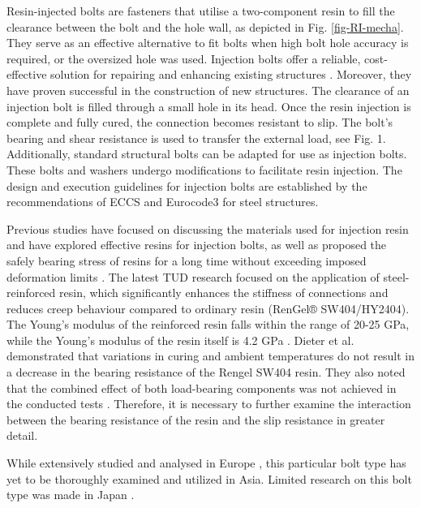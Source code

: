  Resin-injected bolts are fasteners that utilise a two-component resin to fill the clearance between the bolt and the hole wall, as depicted in Fig. \ref{fig-RI-mecha}. They serve as an effective alternative to fit bolts when high bolt hole accuracy is required, or the oversized hole was used. Injection bolts offer a reliable, cost-effective solution for repairing and enhancing existing structures \cite{gresnigt1996injbolt}. Moreover, they have proven successful in the construction of new structures. The clearance of an injection bolt is filled through a small hole in its head. Once the resin injection is complete and fully cured, the connection becomes resistant to slip. The bolt's bearing and shear resistance is used to transfer the external load, see  Fig. 1. Additionally, standard structural bolts can be adapted for use as injection bolts. These bolts and washers undergo modifications to facilitate resin injection. The design and execution guidelines for injection bolts are established by the recommendations of ECCS \cite{eccs1985} and Eurocode3 \cite{eurocode3-21,en1090-2-2018} for steel structures.
 
Previous studies have focused on discussing the materials used for injection resin and have explored effective resins for injection bolts, as well as proposed the safely bearing stress of resins for a long time without exceeding imposed deformation limits \cite{kolstein2017injbolt-mec}. The latest TUD research focused on the application of steel-reinforced resin, which significantly enhances the stiffness of connections and reduces creep behaviour compared to ordinary resin (RenGel® SW404/HY2404). The Young's modulus of the reinforced resin falls within the range of 20-25 GPa, while the Young's modulus of the resin itself is 4.2 GPa \cite{nijgh_new_2017}. Dieter et al. demonstrated that variations in curing and ambient temperatures do not result in a decrease in the bearing resistance of the Rengel SW404 resin. They also noted that the combined effect of both load-bearing components was not achieved in the conducted tests \cite{ungermann2023injbolt-mec}. Therefore, it is necessary to further examine the interaction between the bearing resistance of the resin and the slip resistance in greater detail.

While extensively studied and analysed in Europe \cite{gresnigt1996injbolt, kolstein2017injbolt-mec, ungermann2023injbolt-mec, pedrosa2020injbolt-fati, pedrosa2022injbolt-mec,pedrosa2021injbolt-fati,gresnigt2000injtbolt-use}, this particular bolt type has yet to be thoroughly examined and utilized in Asia. Limited research on this bolt type was made in Japan \cite{Yaegaki2018}.

